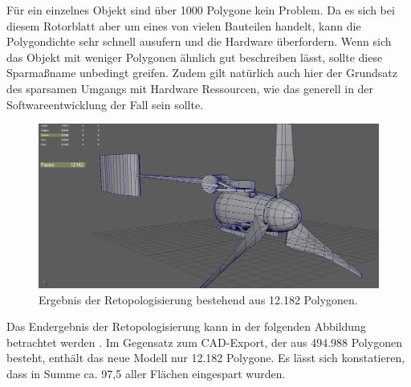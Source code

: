 Für ein einzelnes Objekt sind über 1000 Polygone kein Problem. Da es sich bei diesem Rotorblatt aber um eines von vielen Bauteilen handelt, kann die Polygondichte sehr schnell ausufern und die Hardware überfordern. Wenn sich das Objekt mit weniger Polygonen ähnlich gut beschreiben lässt, sollte diese Sparmaßname unbedingt greifen. Zudem gilt natürlich auch hier der Grundsatz des sparsamen Umgangs mit Hardware Ressourcen, wie das generell in der Softwareentwicklung der Fall sein sollte.  

\begin{figure}[H]
	\centering
	\captionsetup{width=1\textwidth}
	\includegraphics[keepaspectratio, width=1\textwidth]{bildquellen/WEA-Vergleich2}
	\caption{Ergebnis der Retopologisierung bestehend aus 12.182 Polygonen.}
	\label{fig:2.7}
\end{figure}

Das Endergebnis der Retopologisierung kann in der folgenden Abbildung betrachtet werden  . Im Gegensatz zum CAD-Export, der aus 494.988 Polygonen besteht, enthält das neue Modell nur 12.182 Polygone. Es lässt sich konstatieren, dass in Summe ca. 97,5 aller Flächen eingespart wurden.
